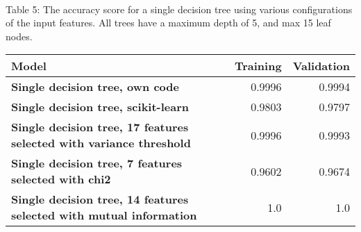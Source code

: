 \documentclass[11pt]{article}
\begin{document}
{ \hspace*{\fill} \\}
Table 5: The accuracy score for a single decision tree using various configurations of the input features. All trees have a maximum depth of 5, and max 15 leaf nodes.
\begin{table}[h!]
	\begin{center}
		\label{tab:table1}
		\begin{tabular}{l|r|r}
			\textbf{Model}                                                      		   & \textbf{Training} & \textbf{Validation}
			\\ \hline
			\textbf{Single decision tree, own code}                                        & 0.9996        & 0.9994              \\ \hline
			\textbf{Single decision tree, scikit-learn}                                    & 0.9803        & 0.9797              \\ \hline
			\textbf{Single decision tree, 17 features selected with variance threshold}    & 0.9996        & 0.9993              \\ \hline
			\textbf{Single decision tree, 7 features selected with chi2}                   & 0.9602        & 0.9674              \\ \hline
			\textbf{Single decision tree, 14 features selected with mutual information}    & 1.0           & 1.0                \\ \hline
		\end{tabular}
	\end{center}
\end{table}
\end{document}
